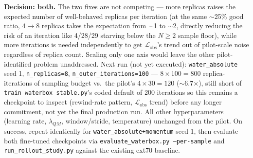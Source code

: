\documentclass[11pt]{article}
\begin{document}
\textbf{Decision: both.} The two fixes are not competing --- more replicas
raises the expected number of well-behaved replicas per iteration (at the
same $\sim$25\% good ratio, $4\to8$ replicas takes the expectation from
$\sim$1 to $\sim$2, directly reducing the risk of an iteration like 4/28/29
starving below the $N\ge2$ sample floor), while more iterations is
needed independently to get $\mathcal{L}_{\text{obs}}$'s trend out of
pilot-scale noise regardless of replica count. Scaling only one axis would
leave the other pilot-identified problem unaddressed. Next run (not yet
executed): \texttt{water\_absolute} seed 1, \texttt{n\_replicas=8},
\texttt{n\_outer\_iterations=100} --- $8\times100=800$ replica-iterations
of sampling budget vs.\ the pilot's $4\times30=120$ ($\sim$6.7$\times$),
still short of \texttt{train\_waterbox\_stable.py}'s coded default of 200
iterations so this remains a checkpoint to inspect (rewind-rate pattern,
$\mathcal{L}_{\text{obs}}$ trend) before any longer commitment, not yet the
final production run. All other hyperparameters (learning rate, $\lambda_{QM}$,
window/stride, temperature) unchanged from the pilot. On success, repeat
identically for \texttt{water\_absolute+momentum} seed 1, then evaluate both
fine-tuned checkpoints via \texttt{evaluate\_waterbox.py --per-sample} and
\texttt{run\_rollout\_study.py} against the existing ext70 baseline.
\end{document}
